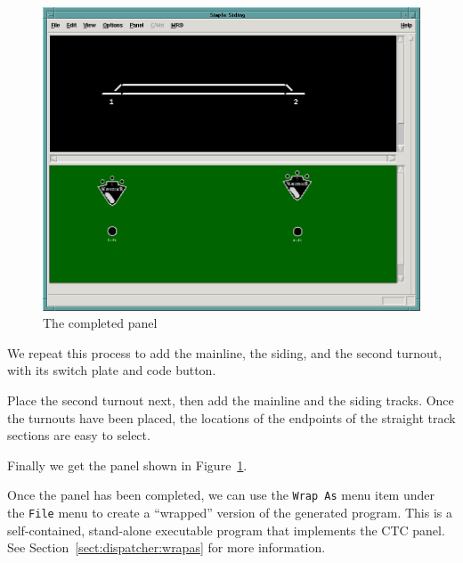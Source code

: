 \clearpage

\begin{figure}[hbpt] 
\begin{centering}
\includegraphics[width=5in]{DISPSimpleTutPanel4.png} 
\caption{The completed panel} 
\label{fig:dispatcher:Tut:Panel4} 
\end{centering}
\end{figure} 
%
We repeat this process to add the mainline, the siding, and the second
turnout, with its switch plate and code button. \begin{tip}Place the
second turnout next, then add the mainline and the siding tracks. Once
the turnouts have been placed, the locations of the endpoints of the
straight track sections are easy to select.\end{tip} Finally we get the
panel shown in Figure~\ref{fig:dispatcher:Tut:Panel4}.

Once the panel has been completed, we can use the \texttt{Wrap As} menu
item under the \texttt{File} menu to create a ``wrapped'' version of
the generated program.  This is a self-contained, stand-alone
executable program that implements the CTC panel. See
Section~\ref{sect:dispatcher:wrapas} for more information.



